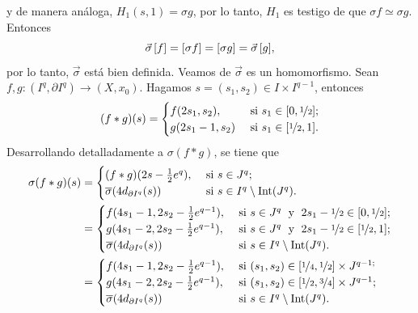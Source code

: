 \begin{dem}
    y de manera análoga, $H_1(s,1)=\sigma g$, por lo tanto, $H_1$ es testigo de que $\sigma f\simeq \sigma g$. Entonces
    \begin{equation*}
        \vec{\sigma}\hspace{0.5mm}[f]=[\sigma f]=[\sigma g]=\vec{\sigma}\hspace{0.5mm}[g],        
    \end{equation*}
    por lo tanto, $\vec{\sigma}$ está bien definida. Veamos de $\vec{\sigma}$ es un homomorfismo. Sean $f,g:(I^q,\partial I^q)\to (X,x_0)$. Hagamos 
    $s=(s_1,s_2)\in I\times I^{q-1}$, entonces
    \begin{equation*}
        (f*g)(s)=\begin{cases}
            f(2s_1,s_2), & \text{ si } s_1\in [0,\nicefrac{1}{2}];\\
            g(2s_1-1,s_2) & \text{ si } s_1\in [\nicefrac{1}{2},1].
        \end{cases}
    \end{equation*}
    Desarrollando detalladamente a $\sigma(f*g)$, se tiene que
    \begin{align*}
        \sigma(f*g)(s)&=\begin{cases}
            (f*g)(2s-\frac{1}{2}e^q), & \text{ si } s\in J^q;\\
            \overline{\sigma}(4d_{\partial I^q}(s)) & \text{ si } s\in I^q\setminus \mathrm{Int}(J^q).
        \end{cases}\\
        &=\begin{cases}
            f(4s_1-1,2s_2-\frac{1}{2}e^{q-1}), & \text{ si } s\in J^q\text{\; y\; } 2s_1-\nicefrac{1}{2}\in [0,\nicefrac{1}{2}];\\
            g(4s_1-2,2s_2-\frac{1}{2}e^{q-1}), & \text{ si } s\in J^q\text{\; y \;} 2s_1-\nicefrac{1}{2}\in [\nicefrac{1}{2},1];\\
            \overline{\sigma}(4d_{\partial I^q}(s)) & \text{ si } s\in I^q\setminus \mathrm{Int}(J^q).
        \end{cases}\\
        &=\begin{cases}
            f(4s_1-1,2s_2-\frac{1}{2}e^{q-1}), & \text{ si } (s_1,s_2)\in [\nicefrac{1}{4},\nicefrac{1}{2}]\times J^{q-1;}\\
            g(4s_1-2,2s_2-\frac{1}{2}e^{q-1}), & \text{ si } (s_1,s_2)\in [\nicefrac{1}{2},\nicefrac{3}{4}]\times J^{q-1};\\
            \overline{\sigma}(4d_{\partial I^q}(s)) & \text{ si } s\in I^q\setminus \mathrm{Int}(J^q).

\end{cases}
\end{align*}
\end{dem}
